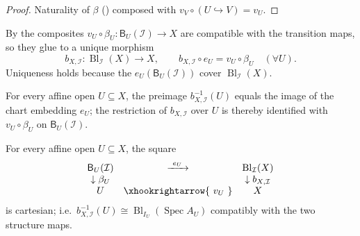 \begin{proof}
  \leanok
  Naturality of $\beta$
  () composed with
  $v_V\circ(U\hookrightarrow V)=v_U$.
\end{proof}

\begin{definition}
  \label{def:nagata-global-blowup-map}
  \leanok

  By  the composites
  $v_U\circ\beta_U\colon\mathsf B_U(\mathcal I)\to X$ are compatible
  with the transition maps, so they glue to a unique morphism
  \[
    b_{X,\mathcal I}\colon
      \operatorname{Bl}_{\mathcal I}(X)\longrightarrow X,
    \qquad
    b_{X,\mathcal I}\circ e_U=v_U\circ\beta_U\quad(\forall U).
  \]
  Uniqueness holds because the $e_U(\mathsf B_U(\mathcal I))$ cover
  $\operatorname{Bl}_{\mathcal I}(X)$.
\end{definition}

\begin{definition}
  \label{def:nagata-global-blowup-affine-restriction-map}
  \leanok

  For every affine open $U\subseteq X$, the preimage
  $b_{X,\mathcal I}^{-1}(U)$ equals the image of the chart embedding
  $e_U$; the restriction of $b_{X,\mathcal I}$ over $U$ is thereby
  identified with $v_U\circ\beta_U$ on
  $\mathsf B_U(\mathcal I)$.
\end{definition}

\begin{proposition}
  \label{prop:nagata-global-blowup-affine-restrict}
  \leanok

  For every affine open $U\subseteq X$, the square
  \[
    \begin{array}{ccc}
      \mathsf B_U(\mathcal I)
        &\xrightarrow{\ e_U\ }
        &\operatorname{Bl}_{\mathcal I}(X)\\
      \downarrow\beta_U& &\downarrow b_{X,\mathcal I}\\
      U&\xhookrightarrow{\ v_U\ }&X
    \end{array}
  \]
  is cartesian; i.e.\
  $b_{X,\mathcal I}^{-1}(U)\cong
    \operatorname{Bl}_{I_U}(\operatorname{Spec}A_U)$
  compatibly with the two structure maps.
\end{proposition}

